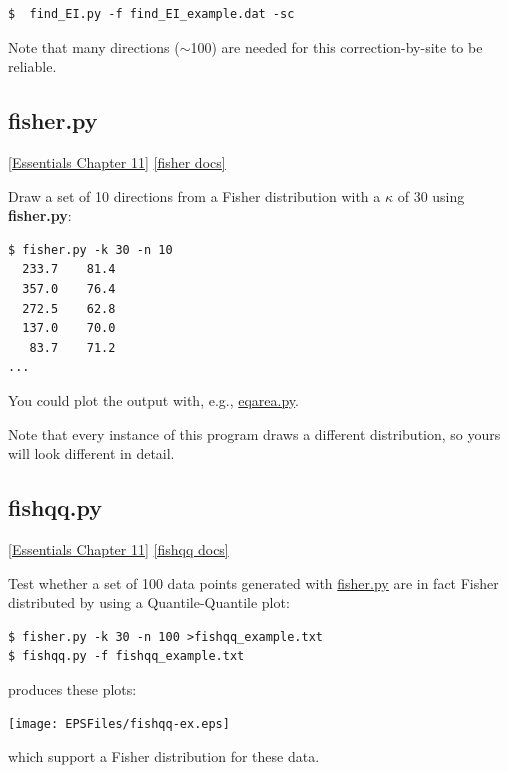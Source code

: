 \documentclass[11pt]{book}
\begin{document}
{{{\begin{verbatim}
$  find_EI.py -f find_EI_example.dat -sc
\end{verbatim}

Note that many directions ($\sim$100) are needed for this correction-by-site to be reliable.

%

\subsection{fisher.py}
\href{http://earthref.org/MAGIC/books/Tauxe/Essentials/WebBook3ch11.html#ch11}{ [Essentials Chapter 11]}
\href{https://github.com/PmagPy/PmagPy/blob/master/programs/fisher.py}{[fisher docs]}

Draw a set of 10 directions from a Fisher distribution with a $\kappa$ of 30 using {\bf fisher.py}:

\begin{verbatim}
$ fisher.py -k 30 -n 10
  233.7    81.4
  357.0    76.4
  272.5    62.8
  137.0    70.0
   83.7    71.2
...
  \end{verbatim}

  You could plot the output with, e.g., \href{#eqarea.py}{eqarea.py}.

  Note that every instance of this program draws a different distribution, so yours will look different in detail.


\subsection{fishqq.py}
\href{http://earthref.org/MAGIC/books/Tauxe/Essentials/WebBook3ch11.html#ch11}{ [Essentials Chapter 11]}
\href{https://github.com/PmagPy/PmagPy/blob/master/programs/fishqq.py}{[fishqq docs]}

Test whether a set of 100 data points generated with \href{#fisher.py}{fisher.py} are in fact Fisher distributed by using a Quantile-Quantile plot:

\begin{verbatim}
$ fisher.py -k 30 -n 100 >fishqq_example.txt
$ fishqq.py -f fishqq_example.txt
\end{verbatim}

\noindent produces these plots:



\texttt{[image: EPSFiles/fishqq-ex.eps]}

\noindent which support a Fisher distribution for these data.



}}}
\end{document}
